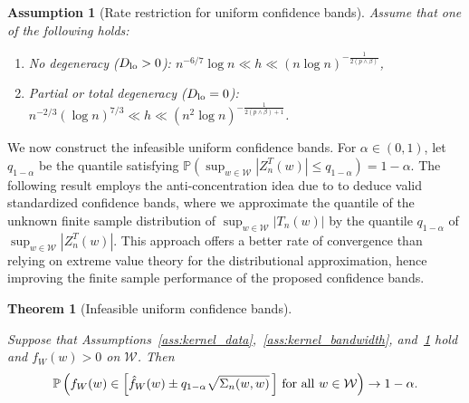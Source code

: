 \documentclass[11pt,lof]{puthesis}
\renewcommand{\P}{\ensuremath{\mathbb{P}}}
\newcommand{\cW}{\ensuremath{\mathcal{W}}}
\newcommand{\Dl}{\ensuremath{D_{\textup{lo}}}}
\theoremstyle{break}
\newtheorem{theorem}{Theorem}[section]
\newtheorem{assumption}{Assumption}[section]
\theoremstyle{proof}
\begin{document}
\begin{assumption}[Rate restriction for uniform confidence bands]
  \label{ass:kernel_rates}
  Assume that one of the following holds:
  \begin{enumerate}[label=(\roman*)]

    \item
      \label{it:kernel_rate_non}
      No degeneracy ($\Dl > 0$):
      $n^{-6/7} \log n \ll h \ll (n \log n)^{-\frac{1}{2(p \wedge \beta)}}$,

    \item
      \label{it:kernel_rate_degen}
      Partial or total degeneracy ($\Dl = 0$):
      $n^{-2/3} (\log n)^{7/3} \ll h
      \ll (n^2 \log n)^{-\frac{1}{2(p \wedge \beta) + 1}}$.
  \end{enumerate}
\end{assumption}

We now construct the infeasible uniform confidence bands.
For $\alpha \in (0,1)$, let $q_{1-\alpha}$ be the quantile satisfying
$ \P\left(\sup_{w \in \cW} \left| Z_n^T(w) \right| \leq q_{1-\alpha} \right)
= 1 - \alpha$.
The following result employs the anti-concentration idea due to
\citet{chernozhukov2014anti} to deduce valid standardized confidence bands,
where we approximate the quantile of the unknown finite sample distribution of
$\sup_{w\in\cW} |T_n(w)|$ by the quantile $q_{1-\alpha}$ of
$\sup_{w\in\cW}|Z_n^T(w)|$. This approach offers a better rate of convergence
than relying on extreme value theory for the distributional approximation,
hence improving the finite sample performance of the proposed confidence bands.

\begin{theorem}[Infeasible uniform confidence bands]
  \label{thm:kernel_infeasible_ucb}

  Suppose that Assumptions~\ref{ass:kernel_data},~\ref{ass:kernel_bandwidth},
  and~\ref{ass:kernel_rates} hold and $f_W(w) > 0$ on $\cW$. Then
  \begin{align*}
    \P\left(
      f_W(w) \in
      \left[ \hat f_W(w) \pm q_{1-\alpha} \sqrt{\Sigma_n(w,w)} \, \right]
      \, \textup{for all } w \in \cW
    \right)
    \to 1 - \alpha.
  \end{align*}
\end{theorem}
\end{document}
